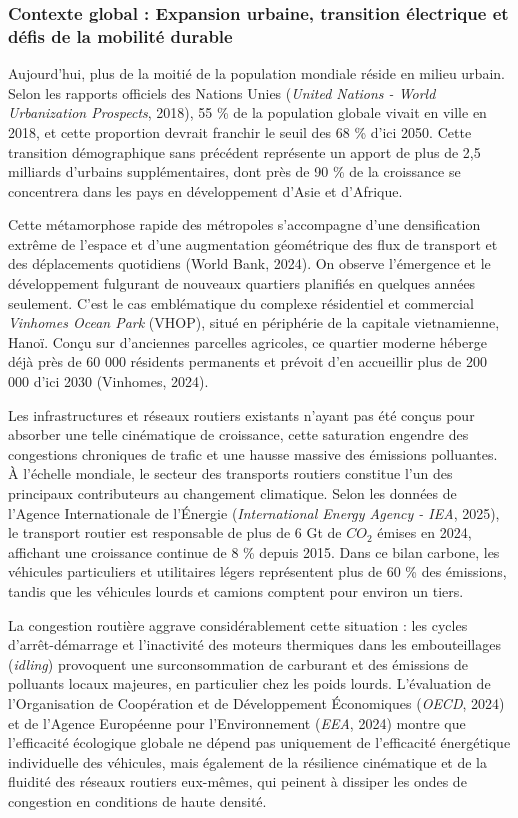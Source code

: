 \documentclass[10pt, a4paper]{article}
\begin{document}
\subsubsection{Contexte global : Expansion urbaine, transition
électrique et défis de la mobilité
durable}\label{contexte-global-expansion-urbaine-transition-uxe9lectrique-et-duxe9fis-de-la-mobilituxe9-durable}

Aujourd'hui, plus de la moitié de la population mondiale réside en
milieu urbain. Selon les rapports officiels des Nations Unies
(\emph{United Nations - World Urbanization Prospects}, 2018), 55 \% de
la population globale vivait en ville en 2018, et cette proportion
devrait franchir le seuil des 68 \% d'ici 2050. Cette transition
démographique sans précédent représente un apport de plus de 2,5
milliards d'urbains supplémentaires, dont près de 90 \% de la croissance
se concentrera dans les pays en développement d'Asie et d'Afrique.

Cette métamorphose rapide des métropoles s'accompagne d'une
densification extrême de l'espace et d'une augmentation géométrique des
flux de transport et des déplacements quotidiens (World Bank, 2024). On
observe l'émergence et le développement fulgurant de nouveaux quartiers
planifiés en quelques années seulement. C'est le cas emblématique du
complexe résidentiel et commercial \emph{Vinhomes Ocean Park} (VHOP),
situé en périphérie de la capitale vietnamienne, Hanoï. Conçu sur
d'anciennes parcelles agricoles, ce quartier moderne héberge déjà près
de 60 000 résidents permanents et prévoit d'en accueillir plus de 200
000 d'ici 2030 (Vinhomes, 2024).

Les infrastructures et réseaux routiers existants n'ayant pas été conçus
pour absorber une telle cinématique de croissance, cette saturation
engendre des congestions chroniques de trafic et une hausse massive des
émissions polluantes. À l'échelle mondiale, le secteur des transports
routiers constitue l'un des principaux contributeurs au changement
climatique. Selon les données de l'Agence Internationale de l'Énergie
(\emph{International Energy Agency - IEA}, 2025), le transport routier
est responsable de plus de 6 Gt de \(CO_2\) émises en 2024, affichant
une croissance continue de 8 \% depuis 2015. Dans ce bilan carbone, les
véhicules particuliers et utilitaires légers représentent plus de 60 \%
des émissions, tandis que les véhicules lourds et camions comptent pour
environ un tiers.

La congestion routière aggrave considérablement cette situation : les
cycles d'arrêt-démarrage et l'inactivité des moteurs thermiques dans les
embouteillages (\emph{idling}) provoquent une surconsommation de
carburant et des émissions de polluants locaux majeures, en particulier
chez les poids lourds. L'évaluation de l'Organisation de Coopération et
de Développement Économiques (\emph{OECD}, 2024) et de l'Agence
Européenne pour l'Environnement (\emph{EEA}, 2024) montre que
l'efficacité écologique globale ne dépend pas uniquement de l'efficacité
énergétique individuelle des véhicules, mais également de la résilience
cinématique et de la fluidité des réseaux routiers eux-mêmes, qui
peinent à dissiper les ondes de congestion en conditions de haute
densité.
\end{document}
